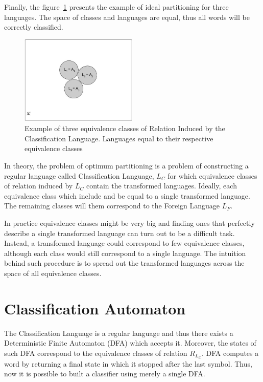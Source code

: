\documentclass{mini}
\begin{document}
Finally, the figure~\ref{fig:eq_classes_ideal} presents the example of ideal partitioning for three languages. The space of classes and languages are equal, thus all words will be correctly classified.

\begin{figure}[H]
    \centering
    \includegraphics[width=0.5\textwidth]{./images/equivalence_classes_ideal.jpg}
    \caption{Example of three equivalence classes of Relation Induced by the Classification Language. Languages equal to their respective equivalence classes}
    \label{fig:eq_classes_ideal}
\end{figure}

In theory, the problem of optimum partitioning is a problem of constructing a regular language called Classification Language, $L_{C}$ for which equivalence classes of relation induced by $L_{C}$ contain the transformed languages. Ideally, each equivalence class which include and be equal to a single transformed language. The remaining classes will them correspond to the Foreign Language $L_{F}$. 

In practice equivalence classes might be very big and finding ones that perfectly describe a single transformed language can turn out to be a difficult task. Instead, a transformed language could correspond to few equivalence classes, although each class would still correspond to a single language. The intuition behind such procedure is to spread out the transformed languages across the space of all equivalence classes.

\section{Classification Automaton}\label{sec:lan_theory_class_lan_dfa}

The Classification Language is a regular language and thus there exists a Deterministic Finite Automaton (DFA) which accepts it. Moreover, the states of such DFA correspond to the equivalence classes of relation $R_{L_{C}}$. DFA computes a word by returning a final state in which it stopped after the last symbol. Thus, now it is possible to built a classifier using merely a single DFA.
\end{document}

